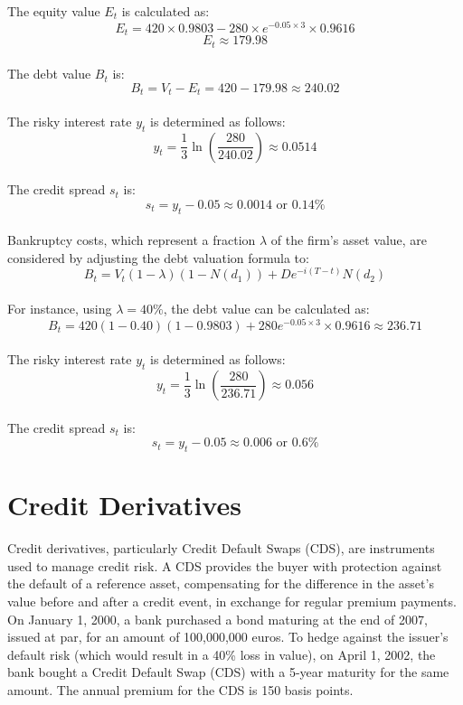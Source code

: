 \documentclass[a4paper,10pt]{article}
\begin{document}
\noindent The equity value \( E_t \) is calculated as: \\
\[ E_t = 420 \times 0.9803 - 280 \times e^{-0.05 \times 3} \times 0.9616 \]
\[ E_t \approx 179.98 \]\\

\noindent The debt value \( B_t \) is: \\
\[ B_t = V_t - E_t = 420 - 179.98 \approx 240.02 \]\\

\noindent The risky interest rate \( y_t \) is determined as follows: \\
\[ y_t = \frac{1}{3} \ln\left(\frac{280}{240.02}\right) \approx 0.0514  \]\\

\noindent The credit spread \( s_t \) is: 
\[ s_t = y_t - 0.05 \approx 0.0014 \text{ or } 0.14\% \]\\

\noindent Bankruptcy costs, which represent a fraction \( \lambda \) of the firm's asset value, are considered by adjusting the debt valuation formula to:
\[ B_t = V_t (1 - \lambda)(1 - N(d_1)) + De^{-i(T-t)} N(d_2) \]\\
\noindent For instance, using \( \lambda = 40\% \), the debt value can be calculated as:
\[ B_t = 420 (1 - 0.40)(1 - 0.9803) + 280 e^{-0.05 \times 3} \times 0.9616 \approx 236.71 \]\\

\noindent The risky interest rate \( y_t \) is determined as follows: \\
\[ y_t = \frac{1}{3} \ln\left(\frac{280}{236.71}\right) \approx 0.056 \]\\

\noindent The credit spread \( s_t \) is: 
\[ s_t = y_t - 0.05 \approx 0.006 \text{ or } 0.6\% \]

\section{Credit Derivatives}
\noindent Credit derivatives, particularly Credit Default Swaps (CDS), are instruments used to manage credit risk. A CDS provides the buyer with protection against the default of a reference asset, compensating for the difference in the asset's value before and after a credit event, in exchange for regular premium payments.\\

\noindent On January 1, 2000, a bank purchased a bond maturing at the end of 2007, issued at par, for an amount of 100,000,000 euros. To hedge against the issuer's default risk (which would result in a 40\% loss in value), on April 1, 2002, the bank bought a Credit Default Swap (CDS) with a 5-year maturity for the same amount. The annual premium for the CDS is 150 basis points. \\
\end{document}
